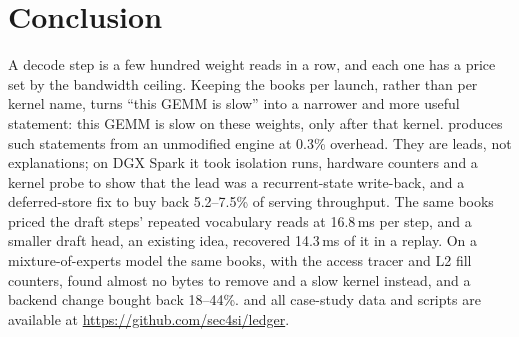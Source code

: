 \section{Conclusion}\label{sec:conclusion}

A decode step is a few hundred weight reads in a row, and each one has a price set by the
bandwidth ceiling. Keeping the books per launch, rather than per kernel name, turns ``this GEMM is
slow'' into a narrower and more useful statement: this GEMM is slow on these weights, only after
that kernel. \sys{} produces such statements from an unmodified engine at 0.3\% overhead. They
are leads, not explanations; on DGX Spark it took isolation runs, hardware counters and a kernel
probe to show that the lead was a recurrent-state write-back, and a deferred-store fix to buy back 5.2--7.5\% of serving throughput. The same
books priced the draft steps' repeated vocabulary reads at 16.8\,ms per step, and a smaller draft head, an existing idea, recovered 14.3\,ms of it in a replay. On a
mixture-of-experts model the same books, with the access tracer and L2 fill counters, found almost no bytes to remove and a slow kernel instead, and a backend change bought back 18--44\%. \sys{} and all case-study data and scripts are available at
\url{https://github.com/sec4si/ledger}.
